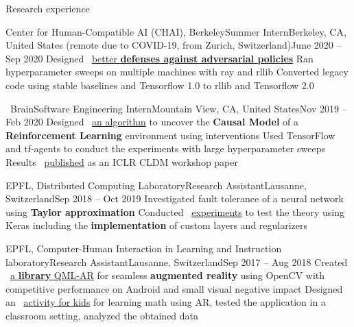 \documentclass{resume} %
\newcommand{\mylink}{{\color{gray}\faExternalLink}}
\begin{document}
\begin{rSection}{Research experience}
	\begin{rSubsection}{Center for Human-Compatible AI (CHAI), Berkeley}{Summer Intern}{Berkeley, CA, United States (remote due to COVID-19, from Zurich, Switzerland)}{June 2020 -- Sep 2020}
		\myitem Designed \mylink~\href{https://github.com/HumanCompatibleAI/better-adversarial-defenses/} {better {\bf defenses against adversarial policies}}
		\myitem Ran hyperparameter sweeps on multiple machines with ray and rllib
		\myitem Converted legacy code using stable baselines and Tensorflow 1.0 to rllib and Tensorflow 2.0
	\end{rSubsection}
	
	
	\begin{rSubsection}{{\large\vspace*{-0.7mm}\google}\ Brain}{Software Engineering Intern}{Mountain View, CA, United States}{Nov 2019 -- Feb 2020}
		\myitem Designed \mylink~\href{https://causalrlworkshop.github.io/program/cldm_8.html}{an algorithm} to uncover the {\bf Causal Model} of a {\bf Reinforcement Learning} environment using interventions
		\myitem Used TensorFlow and tf-agents to conduct the experiments with large hyperparameter sweeps
		\myitem Results \mylink~\href{https://causalrlworkshop.github.io/pdf/CLDM_8.pdf}{published} as an ICLR CLDM workshop paper
	\end{rSubsection}


	\begin{rSubsection}{EPFL, Distributed Computing Laboratory}{Research Assistant}{Lausanne, Switzerland}{Sep 2018 -- Oct 2019}
		\myitem Investigated fault tolerance of a neural network using {\bf Taylor approximation}
		\myitem Conducted \mylink~\href{https://github.com/LPD-EPFL/ProbabilisticFaultToleranceNNs}{experiments} to test the theory using Keras including the {\bf implementation} of custom layers and regularizers
	\end{rSubsection}

	\begin{rSubsection}{EPFL, Computer-Human Interaction in Learning and Instruction laboratory}{Research Assistant}{Lausanne, Switzerland}{Sep 2017 -- Aug 2018}
		\myitem Created \mylink~\href{https://github.com/chili-epfl/qml-ar}{a {\color{black} \bf library} QML-AR} for seamless {\bf augmented reality} using OpenCV with competitive performance on Android and small visual negative impact
		\myitem Designed an \mylink~\href{https://youtu.be/B4-2qYsAKH4}{activity for kids} for learning math using AR, tested the application in a classroom setting, analyzed the obtained data
	\end{rSubsection}
	

\end{rSection}
\end{document}

